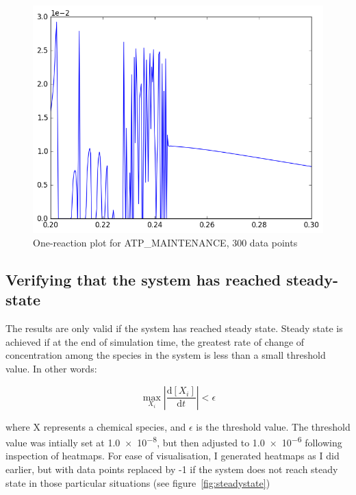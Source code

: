 \documentclass[parskip=full]{scrreprt}
\begin{document}
\begin{figure}[htbp]
  \centering
  \includegraphics[scale=0.5]{atpmaintenanceonereac}
  \caption{One-reaction plot for ATP\_MAINTENANCE, 300 data points}
  \label{fig:atpmaintenanceonereac}
\end{figure}

\subsection{Verifying that the system has reached steady-state}
\label{ssec:steadystate}

The results are only valid if the system has reached steady state. Steady state is achieved if at the end of simulation time, the greatest rate of change of concentration among the species in the system is less than a small threshold value. In other words:

\[
  \max_{X_{i}} \left | \frac{\mathrm{d}[X_{i}]}{\mathrm{d}t} \right | < \epsilon
\]

where X represents a chemical species, and $\epsilon$ is the threshold value. The threshold value was intially set at \num{1.0e-8}, but then adjusted to \num{1.0e-6} following inspection of heatmaps. For ease of visualisation, I generated heatmaps as I did earlier, but with data points replaced by -1 if the system does not reach steady state in those particular situations (see figure~\ref{fig:steadystate})
\end{document}
